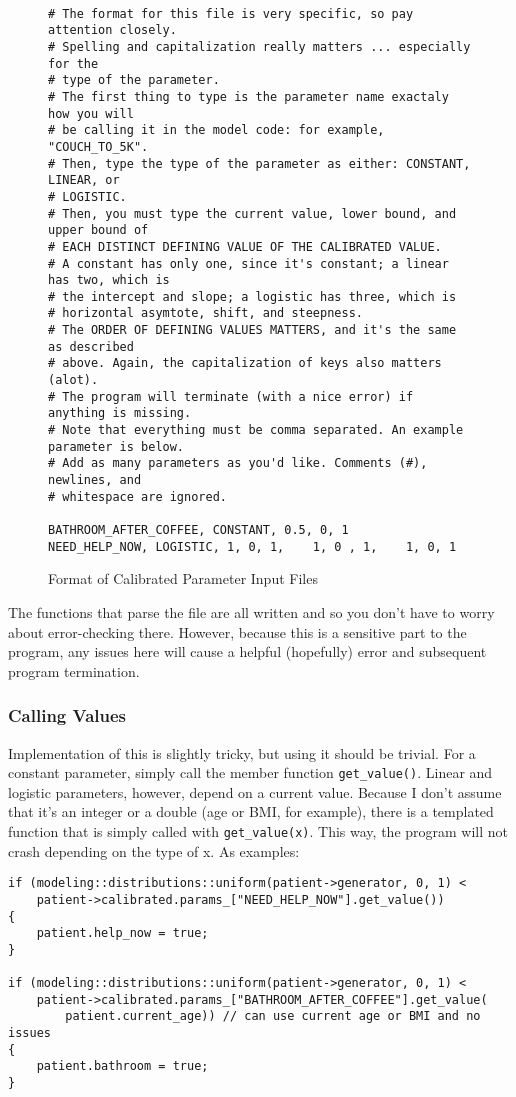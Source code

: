 \documentclass{article}
\begin{document}
\begin{figure}[t]
    \caption{Format of Calibrated Parameter Input Files}
    \label{fig:calibration_input_file}
    \begin{verbatim}
    
# The format for this file is very specific, so pay attention closely.
# Spelling and capitalization really matters ... especially for the
# type of the parameter.
# The first thing to type is the parameter name exactaly how you will 
# be calling it in the model code: for example, "COUCH_TO_5K".
# Then, type the type of the parameter as either: CONSTANT, LINEAR, or
# LOGISTIC.
# Then, you must type the current value, lower bound, and upper bound of
# EACH DISTINCT DEFINING VALUE OF THE CALIBRATED VALUE.
# A constant has only one, since it's constant; a linear has two, which is
# the intercept and slope; a logistic has three, which is
# horizontal asymtote, shift, and steepness.
# The ORDER OF DEFINING VALUES MATTERS, and it's the same as described
# above. Again, the capitalization of keys also matters (alot).
# The program will terminate (with a nice error) if anything is missing.
# Note that everything must be comma separated. An example parameter is below.
# Add as many parameters as you'd like. Comments (#), newlines, and
# whitespace are ignored.

BATHROOM_AFTER_COFFEE, CONSTANT, 0.5, 0, 1
NEED_HELP_NOW, LOGISTIC, 1, 0, 1,    1, 0 , 1,    1, 0, 1
    \end{verbatim}
\end{figure}

The functions that parse the file are all written and so you don't have to worry about error-checking there. However, because this is a sensitive part to the program, any issues here will cause a helpful (hopefully) error and subsequent program termination.

\subsubsection{Calling Values}

Implementation of this is slightly tricky, but using it should be trivial. For a constant parameter, simply call the member function \verb|get_value()|. Linear and logistic parameters, however, depend on a current value. Because I don't assume that it's an integer or a double (age or BMI, for example), there is a templated function that is simply called with \verb|get_value(x)|. This way, the program will not crash depending on the type of x. As examples:

\begin{verbatim}
if (modeling::distributions::uniform(patient->generator, 0, 1) <
    patient->calibrated.params_["NEED_HELP_NOW"].get_value())
{
    patient.help_now = true;    
}

if (modeling::distributions::uniform(patient->generator, 0, 1) < 
    patient->calibrated.params_["BATHROOM_AFTER_COFFEE"].get_value(
        patient.current_age)) // can use current age or BMI and no issues
{
    patient.bathroom = true;
}
\end{verbatim}
\end{document}
